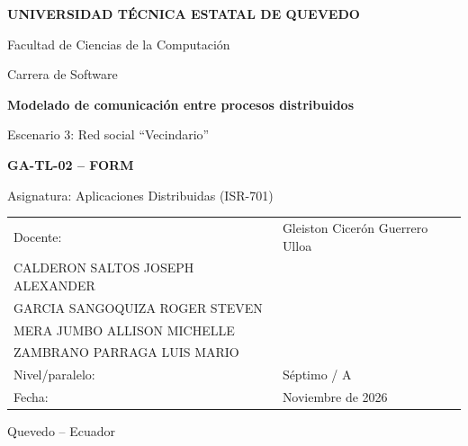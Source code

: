 \documentclass[12pt,a4paper]{article}
\begin{document}

\hypersetup{pageanchor=false}

\begin{titlepage}
\centering

{\large\bfseries UNIVERSIDAD TÉCNICA ESTATAL DE QUEVEDO\par}

\vspace{0.4cm}

{\large Facultad de Ciencias de la Computación\par}
{\large Carrera de Software\par}

\vspace{1.5cm}

{\Large\bfseries Modelado de comunicación entre procesos distribuidos\par}

\vspace{0.4cm}

{\large Escenario 3: Red social ``Vecindario''\par}

\vspace{1.2cm}

{\large\bfseries GA-TL-02 -- FORM\par}
{\large Asignatura: Aplicaciones Distribuidas (ISR-701)\par}

\vspace{1cm}

\begin{tabular}{ll}
Docente: & Gleiston Cicerón Guerrero Ulloa \\
CALDERON SALTOS JOSEPH ALEXANDER & \underline{\hspace{8cm}} \\
GARCIA SANGOQUIZA ROGER STEVEN & \underline{\hspace{8cm}} \\
MERA JUMBO ALLISON MICHELLE & \underline{\hspace{8cm}} \\
ZAMBRANO PARRAGA LUIS MARIO & \underline{\hspace{8cm}} \\
Nivel/paralelo: & Séptimo / A \\
Fecha: & Noviembre de 2026 \\
\end{tabular}

\vfill

{\large Quevedo -- Ecuador\par}

\end{titlepage}
\end{document}
